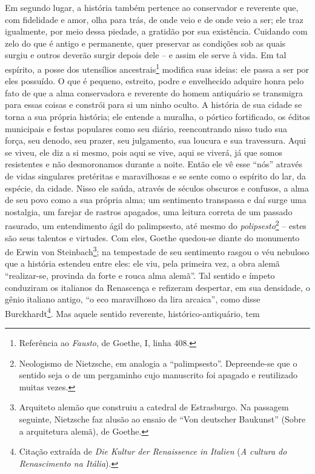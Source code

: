 Em segundo lugar, a história também pertence ao conservador e reverente que, 
com fidelidade e amor, olha para trás, de onde veio e de
onde veio a ser; ele traz igualmente, por meio dessa piedade, a gratidão
por sua existência. Cuidando com zelo do que é antigo e permanente, quer preservar
 as condições sob as quais surgiu e outros deverão
surgir depois dele -- e assim ele serve à vida. Em tal espírito, a posse
dos utensílios ancestrais\footnote{Referência ao \emph{Fausto}, de
  Goethe, I, linha 408.} modifica suas ideias: ele passa a ser por eles
possuído. O que é pequeno, estreito, podre e envelhecido adquire honra
pelo fato de que a alma conservadora e reverente do homem antiquário se
transmigra para essas coisas e constrói para si um ninho oculto. A
história de sua cidade se torna a sua própria história; ele entende a
muralha, o pórtico fortificado, os éditos municipais e festas populares
como seu diário, reencontrando nisso tudo sua força, seu denodo, seu
prazer, seu julgamento, sua loucura e sua travessura. Aqui se viveu, ele
diz a si mesmo, pois aqui se vive, aqui se viverá, já que somos
resistentes e não desmoronamos durante a noite. Então ele vê esse
``nós'' através de vidas singulares pretéritas e maravilhosas e se sente
como o espírito do lar, da espécie, da cidade. Nisso ele saúda, através
de séculos obscuros e confusos, a alma de seu povo como a sua própria
alma; um sentimento transpassa e daí surge uma nostalgia, um farejar de
rastros apagados, uma leitura correta de um passado rasurado, um
entendimento ágil do palimpsesto, até mesmo do \emph{polipsesto}\footnote{Neologismo
  de Nietz\-sche, em analogia a ``palimpsesto''. Depreende-se que o
  sentido seja o de um pergaminho cujo manuscrito foi apagado e
  reutilizado muitas vezes.} -- estes são seus talentos e virtudes. Com
eles, Goethe quedou-se diante do monumento de Erwin von
Steinbach\footnote{Arquiteto alemão que construiu a catedral de
  Estrasburgo. Na passagem seguinte, Nietz\-sche faz alusão ao ensaio de
  ``Von deutscher Baukunst'' (Sobre a arquitetura alemã), de Goethe.};
na tempestade de seu sentimento rasgou o véu nebuloso que a história
estendeu entre eles: ele viu, pela primeira vez, a obra alemã
``realizar-se, provinda da forte e rouca alma alemã''. Tal sentido e
ímpeto conduziram os italianos da Renascença e refizeram despertar, em
sua densidade, o gênio italiano antigo, ``o eco maravilhoso da lira
arcaica'', como disse Burckhardt\footnote{Citação extraída de \emph{Die
  Kultur der Renaissence in Italien} (\emph{A cultura do Renascimento na
  Itália}).}. Mas aquele sentido reverente, histórico-antiquário, tem
